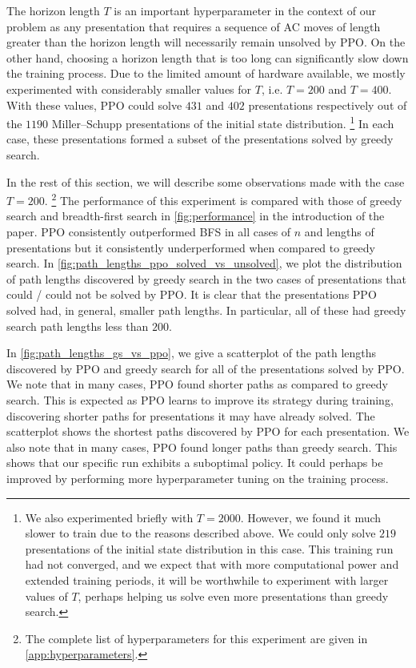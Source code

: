 The horizon length $T$ is an important hyperparameter in the context of our problem as any presentation that requires a sequence of AC moves of length greater than the horizon length will necessarily remain unsolved by PPO. On the other hand, choosing a horizon length that is too long can significantly slow down the training process. Due to the limited amount of hardware available, we mostly experimented with considerably smaller values for $T$, i.e. $T=200$ and $T=400$.  With these values, PPO could solve $431$ and $402$ presentations respectively out of the $1190$ Miller--Schupp presentations of the initial state distribution.
\footnote{
We also experimented briefly with $T=2000$. However, we found it much slower to train due to the reasons described above. We could only solve $219$ presentations of the initial state distribution in this case. This training run had not converged, and we expect that with more computational power and extended training periods, it will be worthwhile to experiment with larger values of $T$, perhaps helping us solve even more presentations than greedy search.
}
In each case, these presentations formed a subset of the presentations solved by greedy search.
\newline

In the rest of this section, we will describe some observations made with the case $T=200$.
\footnote{
The complete list of hyperparameters for this experiment are given in \autoref{app:hyperparameters}.
} The performance of this experiment is compared with those of greedy search and breadth-first search in \autoref{fig:performance} in the introduction of the paper. PPO consistently outperformed BFS in all cases of $n$ and lengths of presentations but it consistently underperformed when compared to greedy search. In \autoref{fig:path_lengths_ppo_solved_vs_unsolved}, we plot the distribution of path lengths discovered by greedy search in the two cases of presentations that could / could not be solved by PPO. It is clear that the presentations PPO solved had, in general, smaller path lengths. In particular, all of these had greedy search path lengths less than $200$.
\newline

In \autoref{fig:path_lengths_gs_vs_ppo}, we give a scatterplot of the path lengths discovered by PPO and greedy search for all of the presentations solved by PPO. We note that in many cases, PPO found shorter paths as compared to greedy search. This is expected as PPO learns to improve its strategy during training, discovering shorter paths for presentations it may have already solved. The scatterplot shows the shortest paths discovered by PPO for each presentation. We also note that in many cases, PPO found longer paths than greedy search. This shows that our specific run exhibits a suboptimal policy. It could perhaps be improved by performing more hyperparameter tuning on the training process.

